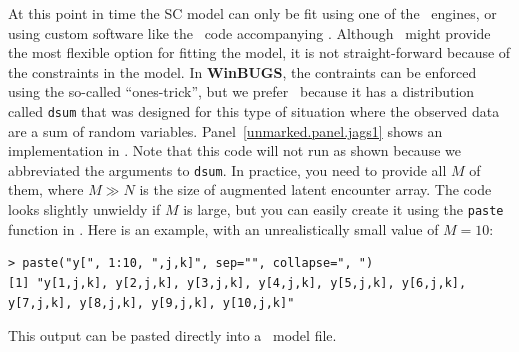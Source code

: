 At this point in time the SC model can only be fit using one of the
\bugs~engines, or using custom software like the \R~code accompanying
\citet{chandler_royle:2012}. Although \bugs~might provide the most
flexible option for fitting the model, it is not
straight-forward because of the
constraints in the model. In \textbf{WinBUGS}, the contraints can be
enforced using the so-called ``ones-trick'', but we prefer
\jags~because it has a distribution
called \verb+dsum+ that was designed for this type
of situation where the observed data are a sum of random
variables. %
Panel~\ref{unmarked.panel.jags1} shows an implementation in \jags.
Note that this code will not run as shown because we abbreviated the
arguments to \verb+dsum+. In practice, you need to provide all $M$ of
them, where $M \gg N$ is the size of augmented latent encounter
array. The code looks slightly unwieldy if $M$ is large, but you can easily create
it using the \verb+paste+ function in \R. Here is an example, with an
unrealistically small value of $M=10$:
\begin{small}
\begin{verbatim}
> paste("y[", 1:10, ",j,k]", sep="", collapse=", ")
[1] "y[1,j,k], y[2,j,k], y[3,j,k], y[4,j,k], y[5,j,k], y[6,j,k],
y[7,j,k], y[8,j,k], y[9,j,k], y[10,j,k]"
\end{verbatim}
\end{small}
This output can be pasted directly into a \jags~model file.

